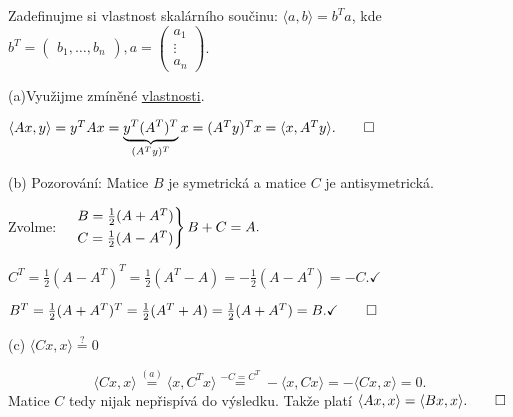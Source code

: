 Zadefinujme si vlastnost skalárního součinu: $\langle a, b\rangle = b^T a$, kde $b^T = 
\begin{pmatrix}
    b_1, \dots, b_n
\end{pmatrix}, a = 
\begin{pmatrix}
    a_1 \\
    \vdots \\
    a_n
\end{pmatrix}$. \label{skalVlastnost}

(a)Využijme zmíněné \hyperref[skalVlastnost]{vlastnosti}. \label{aExistence}

$\langle Ax, y\rangle = y^T Ax = \underbrace{y^T (A^T)^T}_{(A^T y)^T} x = (A^T y)^T x = \langle x, A^T y\rangle. \qed$

(b) Pozorování: Matice $B$ je symetrická a matice $C$ je antisymetrická.

Zvolme:
$\begin{rcases}
    &B = \frac{1}{2} (A + A^T) \\
    &C = \frac{1}{2} (A - A^T)
\end{rcases}
B+C = A.$

$C^T = \frac{1}{2} (A-A^T)^T = \frac{1}{2} (A^T - A) = -\frac{1}{2} (A-A^T) = -C. \checkmark$

$B^T = \frac{1}{2} (A+A^T)^T = \frac{1}{2} (A^T + A) = \frac{1}{2} (A+A^T) = B. \checkmark \qed$


(c) $\langle C x, x\rangle \stackrel{?}{=} 0$

\[
    \langle Cx, x\rangle \stackrel{\hyperref[aExistence]{(a)}}{=} \langle x, C^T x\rangle \stackrel{-C = C^T}{=} 
    - \langle x, Cx\rangle = - \langle Cx, x\rangle = 0.
\]
Matice $C$ tedy nijak nepřispívá do výsledku. Takže platí $\langle Ax, x\rangle = \langle Bx, x\rangle. \qed$

